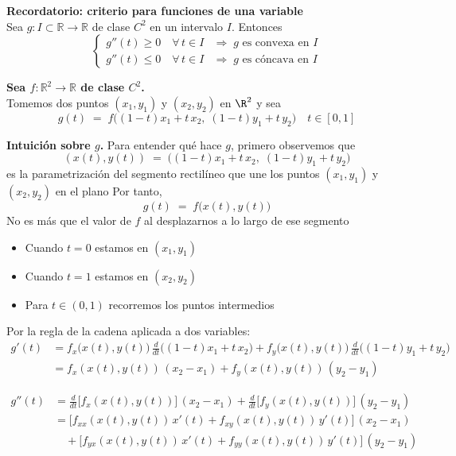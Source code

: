 \documentclass{article}
\begin{document}
\noindent\textbf{Recordatorio: criterio para funciones de una variable}\\
Sea \(g\colon I\subset\mathbb{R}\to\mathbb{R}\) de clase \(C^2\) en un intervalo \(I\). Entonces
\[
\begin{cases}
g''(t)\ge0\quad\forall\,t\in I
&\Longrightarrow\;g\text{ es convexa en }I\\[6pt]
g''(t)\le0\quad\forall\,t\in I
&\Longrightarrow\;g\text{ es cóncava en }I
\end{cases}
\]

\noindent\textbf{Sea \(f\colon\mathbb{R}^2\to\mathbb{R}\) de clase \(C^2\).}\\

Tomemos dos puntos \((x_1,y_1)\) y \((x_2,y_2)\) en \(\R^2\) y sea
\[
g(t) \;=\; f\bigl((1-t)x_1 + t\,x_2,\;(1-t)y_1 + t\,y_2\bigr)
\quad t\in[0,1]
\]

\noindent\textbf{Intuición sobre \(g\).}  
Para entender qué hace \(g\), primero observemos que  
\[
(x(t),y(t)) \;=\;\bigl((1-t)x_1 + t\,x_2,\;(1-t)y_1 + t\,y_2\bigr)
\]
es la parametrización del segmento rectilíneo que une los puntos \((x_1,y_1)\) y \((x_2,y_2)\) en el plano  
Por tanto,
\[
g(t) \;=\; f\bigl(x(t),y(t)\bigr)
\]
No es más que el valor de \(f\) al desplazarnos a lo largo de ese segmento  
\begin{itemize}
    \item Cuando \(t=0\) estamos en \((x_1,y_1)\)  
    \item Cuando \(t=1\) estamos en \((x_2,y_2)\)  
    \item Para \(t\in(0,1)\) recorremos los puntos intermedios  
\end{itemize}

Por la regla de la cadena aplicada a dos variables:
\[
\begin{aligned}
g'(t)
&= f_x\bigl(x(t),y(t)\bigr)\,\frac{d}{dt}\bigl((1-t)x_1 + t\,x_2\bigr)
 + f_y\bigl(x(t),y(t)\bigr)\,\frac{d}{dt}\bigl((1-t)y_1 + t\,y_2\bigr)\\[4pt]
&= f_x(x(t),y(t))\,(x_2 - x_1)
 + f_y(x(t),y(t))\,(y_2 - y_1)
\end{aligned}
\]

\[
\begin{aligned}
g''(t)
&= \frac{d}{dt}\bigl[f_x(x(t),y(t))\bigr]\,(x_2 - x_1)
 + \frac{d}{dt}\bigl[f_y(x(t),y(t))\bigr]\,(y_2 - y_1)\\[6pt]
&= \bigl[f_{xx}(x(t),y(t))\,x'(t)
        + f_{xy}(x(t),y(t))\,y'(t)\bigr]\,(x_2 - x_1)\\
&\quad
 + \bigl[f_{yx}(x(t),y(t))\,x'(t)
        + f_{yy}(x(t),y(t))\,y'(t)\bigr]\,(y_2 - y_1)
\end{aligned}
\]
\end{document}
